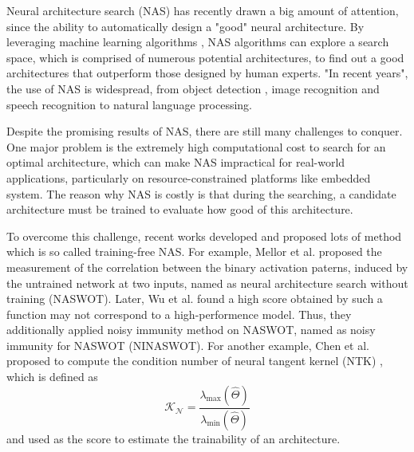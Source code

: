 \documentclass[sigconf]{acmart}
\begin{document}
    Neural architecture search (NAS) has recently drawn a big amount of 
    attention, since the ability to automatically design a "good" neural 
    architecture. By leveraging machine learning algorithms \cite{https://doi.org/10.48550/arxiv.1611.01578}, 
    NAS algorithms can explore a search space, which is comprised of numerous 
    potential architectures, to find out a good architectures that outperform 
    those designed by human experts. "In recent years", the use of NAS is 
    widespread, from object detection \cite{https://doi.org/10.48550/arxiv.2111.13336}, 
    image recognition \cite{https://doi.org/10.48550/arxiv.2006.04647} 
    and speech recognition \cite{https://doi.org/10.48550/arxiv.2011.05649} 
    \cite{mehrotra2021nasbenchasr} to natural language 
    processing. \cite{jiang-etal-2019-improved} 
    \cite{https://doi.org/10.48550/arxiv.2006.07116} 
    \cite{https://doi.org/10.48550/arxiv.2005.14187}

    Despite the promising results of NAS, there are still many challenges 
    to conquer. One major problem is the extremely high computational 
    cost to search for an optimal architecture, which can make NAS impractical 
    for real-world applications, particularly on resource-constrained 
    platforms like embedded system. The reason why NAS is costly is that 
    during the searching, a candidate architecture must be trained to 
    evaluate how good of this architecture.

    To overcome this challenge, recent works developed and proposed lots 
    of method which is so called training-free NAS. 
    For example, Mellor et al. \cite{https://doi.org/10.48550/arxiv.2006.04647} proposed the 
    measurement of the correlation between the binary activation paterns, 
    induced by the untrained network at two inputs, named as neural architecture 
    search without training (NASWOT). 
    Later, Wu et al. \cite{10.1145/3491396.3506510} found a high score 
    obtained by such a function may not correspond to a high-performence 
    model. Thus, they additionally applied noisy immunity method on NASWOT, 
    named as noisy immunity for NASWOT (NINASWOT).
    For another example, Chen et al. proposed to compute the condition 
    number of neural tangent kernel (NTK) \cite{https://doi.org/10.48550/arxiv.2102.11535} 
    \cite{https://doi.org/10.48550/arxiv.2203.09137} \cite{https://doi.org/10.48550/arxiv.2109.00817}, 
    which is defined as %
    \begin{equation}
        \mathcal{K_N}=\frac{\lambda_{\textrm{max}}(\hat\Theta)}{\lambda_{\textrm{min}}(\hat\Theta)}
    \end{equation}
    and used as the score to estimate the trainability of an architecture.
\end{document}
